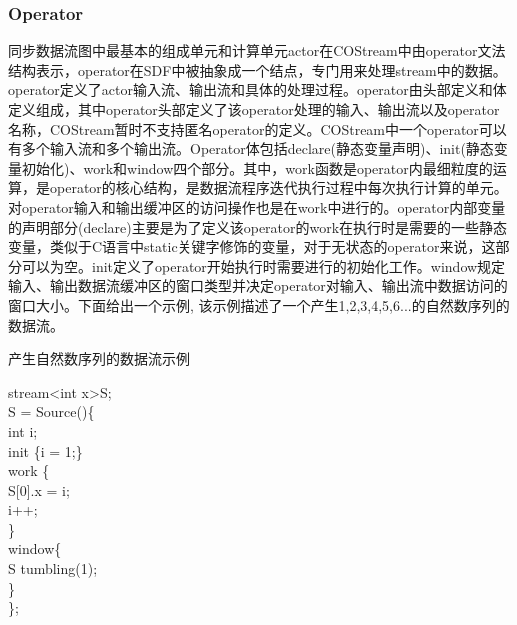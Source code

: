 \subsubsection{Operator}

同步数据流图中最基本的组成单元和计算单元actor在COStream中由operator文法结构表示，operator在SDF中被抽象成一个结点，专门用来处理stream中的数据。operator定义了actor输入流、输出流和具体的处理过程。operator由头部定义和体定义组成，其中operator头部定义了该operator处理的输入、输出流以及operator名称，COStream暂时不支持匿名operator的定义。COStream中一个operator可以有多个输入流和多个输出流。Operator体包括declare(静态变量声明)、init(静态变量初始化)、work和window四个部分。其中，work函数是operator内最细粒度的运算，是operator的核心结构，是数据流程序迭代执行过程中每次执行计算的单元。对operator输入和输出缓冲区的访问操作也是在work中进行的。operator内部变量的声明部分(declare)主要是为了定义该operator的work在执行时是需要的一些静态变量，类似于C语言中static关键字修饰的变量，对于无状态的operator来说，这部分可以为空。init定义了operator开始执行时需要进行的初始化工作。window规定输入、输出数据流缓冲区的窗口类型并决定operator对输入、输出流中数据访问的窗口大小。下面给出一个示例, 该示例描述了一个产生1,2,3,4,5,6...的自然数序列的数据流。

\begin{algorithm}\caption{产生自然数序列的数据流示例}\label{algo:operator-example}
  stream<int x>S;\\
  S = Source()\{\\
  \hspace*{1 pc} int i;\\
  \hspace*{1 pc} init \{i = 1;\}\\
  \hspace*{1 pc} work \{\\
  \hspace*{2 pc} S[0].x = i;\\
  \hspace*{2 pc} i++;\\
  \hspace*{1 pc} \}\\
  \hspace*{1 pc} window\{\\
  \hspace*{2 pc} S tumbling(1);\\
  \hspace*{1 pc} \}\\
  \};
\end{algorithm}

